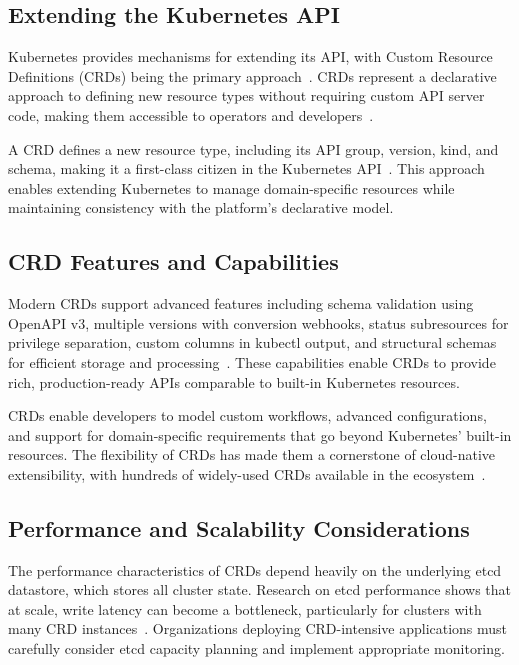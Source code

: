 \subsection{Extending the Kubernetes API}

Kubernetes provides mechanisms for extending its API, with Custom Resource Definitions (CRDs) being the primary approach~\cite{extending_k8s_api, hausenblas2019}. CRDs represent a declarative approach to defining new resource types without requiring custom API server code, making them accessible to operators and developers~\cite{luksa2017}.

A CRD defines a new resource type, including its API group, version, kind, and schema, making it a first-class citizen in the Kubernetes API~\cite{crd_kubernetes, hausenblas2019}. This approach enables extending Kubernetes to manage domain-specific resources while maintaining consistency with the platform's declarative model.

\subsection{CRD Features and Capabilities}

Modern CRDs support advanced features including schema validation using OpenAPI v3, multiple versions with conversion webhooks, status subresources for privilege separation, custom columns in kubectl output, and structural schemas for efficient storage and processing~\cite{crd_features, hausenblas2019}. These capabilities enable CRDs to provide rich, production-ready APIs comparable to built-in Kubernetes resources.

CRDs enable developers to model custom workflows, advanced configurations, and support for domain-specific requirements that go beyond Kubernetes' built-in resources. The flexibility of CRDs has made them a cornerstone of cloud-native extensibility, with hundreds of widely-used CRDs available in the ecosystem~\cite{kubernetes_multivocal_review}.

\subsection{Performance and Scalability Considerations}

The performance characteristics of CRDs depend heavily on the underlying etcd datastore, which stores all cluster state. Research on etcd performance shows that at scale, write latency can become a bottleneck, particularly for clusters with many CRD instances~\cite{etcd_impact}. Organizations deploying CRD-intensive applications must carefully consider etcd capacity planning and implement appropriate monitoring.

